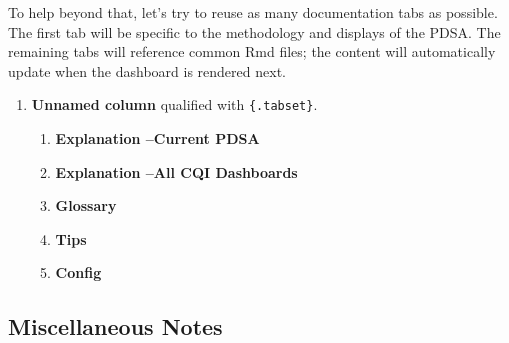 \documentclass[
]{book}
\providecommand{\tightlist}{%
  \setlength{\itemsep}{0pt}\setlength{\parskip}{0pt}}
\begin{document}
To help beyond that, let's try to reuse as many documentation tabs as possible. The first tab will be specific to the methodology and displays of the PDSA. The remaining tabs will reference common Rmd files; the content will automatically update when the dashboard is rendered next.

\begin{enumerate}
\def\labelenumi{\arabic{enumi}.}
\item
  \textbf{Unnamed column} qualified with \texttt{\{.tabset\}}.

  \begin{enumerate}
  \def\labelenumii{\arabic{enumii}.}
  \tightlist
  \item
    \textbf{Explanation --Current PDSA}
  \item
    \textbf{Explanation --All CQI Dashboards}
  \item
    \textbf{Glossary}
  \item
    \textbf{Tips}
  \item
    \textbf{Config}
  \end{enumerate}
\end{enumerate}

\hypertarget{miscellaneous-notes}{%
\subsection{Miscellaneous Notes}\label{miscellaneous-notes}}
\end{document}
